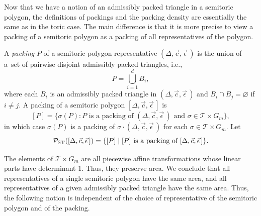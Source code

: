 \documentclass[10pt,a4paper]{amsart}
\numberwithin{equation}{section}
\newcommand{\triangleline}{dashed}
\newcommand{\De}{\Delta}
\newcommand{\PST}{\mathcal{P}_{\rm ST}}
\newcommand{\stpoly}{[\De,\vec{c},\vec{\epsilon}\,]}
\newcommand{\strep}{(\De,\vec{c},\vec{\epsilon}\,)}
\theoremstyle{definition}
\theoremstyle{plain}
\theoremstyle{plain}
\begin{document}






Now that we have a notion of an admissibly packed triangle in a semitoric polygon, the definitions of packings and the packing density are essentially the same as in the toric case.
The main difference is that it is more precise to view a packing of a semitoric polygon as a packing of all representatives of the polygon.

\begin{Definition}\label{def:st-packing}
A \emph{packing} $P$ of a semitoric polygon representative $\strep$ is the union of a~set of pairwise disjoint admissibly packed triangles, i.e.,
\[P = \bigcup_{i=1}^d B_i,\]
where each $B_i$ is an admissibly packed triangle in $\strep$ and $B_i \cap B_j = \varnothing$
if $i \neq j$.
A packing of a semitoric polygon $\stpoly$ is
\[
 [P] = \{\sigma(P)\colon P \text{ is a packing of }\strep\text{ and }\sigma\in\mathcal{T}\times G_m\},
\]
in which case $\sigma(P)$ is a packing of $\sigma\cdot\strep$
for each $\sigma\in\mathcal{T}\times G_m$.
Let \[\PST(\stpoly) = \{[P] \mid [P] \text{ is a packing of } \stpoly \}.\]
\end{Definition}

The elements of $\mathcal{T}\times G_m$ are all piecewise affine transformations whose linear parts have determinant 1.
Thus, they preserve area.
We conclude that all representatives of a single semitoric polygon have the same area, and all representatives of a given admissibly packed triangle have the same area.
Thus, the following notion is independent of the choice of representative of the semitoric polygon and of the packing.
\end{document}
